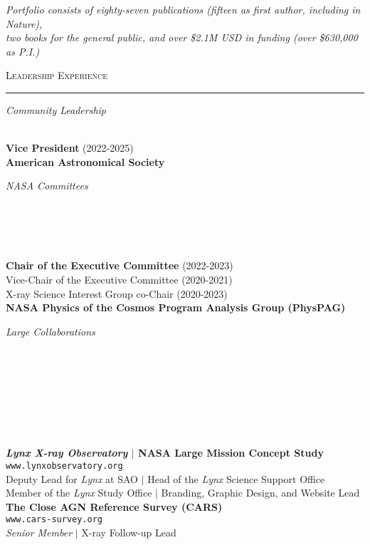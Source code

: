 \documentclass[11pt]{article}
\makeatletter
\def\vhrulefill#1{\leavevmode\leaders\hrule\@height#1\hfill \kern\z@}
\makeatother
\begin{document}
\begin{center}
\textit{Portfolio consists of eighty-seven publications (fifteen as first author, including in Nature), \\ two books for the general public, and over \$2.1M USD in funding (over \$630,000 as P.I.) }  \\
\end{center}


\clearpage




\textsc{Leadership Experience} \vhrulefill{0.4pt}


\vspace{6mm}


\hspace{2.5mm} \parbox{1.5in}{\textit{Community Leadership}\\\\} \parbox{5.15in}{\textbf{Vice President} (2022-2025) \\  \textbf{American Astronomical Society}\\
}

\hspace{2.5mm} \parbox{1.5in}{\textit{NASA Committees}\\\\\\\\\\} \parbox{5.15in}{\textbf{Chair of the Executive Committee} (2022-2023) \\ Vice-Chair of the Executive Committee (2020-2021) \\ X-ray Science Interest Group co-Chair (2020-2023) \\ \textbf{NASA Physics of the Cosmos Program Analysis Group (PhysPAG)}\\
}


\hspace{2.5mm} \parbox{1.5in}{\textit{Large Collaborations \\\\\\\\\\\\\\\\}} \parbox{5.15in}{\textbf{\textit{Lynx X-ray Observatory} $|$ NASA Large Mission Concept Study} \\
\texttt{www.lynxobservatory.org} \\ Deputy Lead for \textit{Lynx} at SAO $|$ Head of the \textit{Lynx} Science Support Office \\ Member of the \textit{Lynx} Study Office $|$ Branding, Graphic Design, and Website Lead \\




\textbf{The Close AGN Reference Survey (CARS)} \\ \texttt{www.cars-survey.org} \\ \textit{Senior Member} $|$ X-ray Follow-up Lead \\
}
\end{document}
